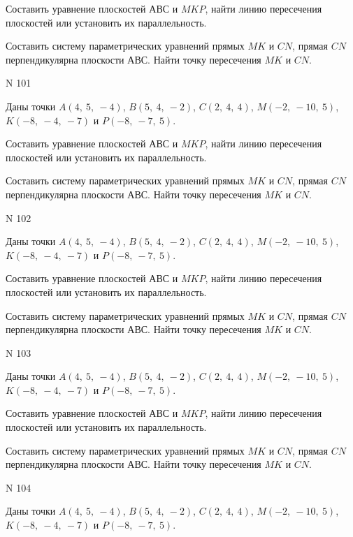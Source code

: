 \documentclass[11pt]{report}
\begin{document}
Составить уравнение плоскостей $АВС$ и $MKP$,
найти линию пересечения плоскостей или установить их параллельность.

Составить систему параметрических уравнений прямых $MK$ и $CN$,
прямая $CN$ перпендикулярна плоскости $АВС$. 
Найти точку пересечения $MK$ и $CN$.



 N 101

Даны точки $A\left( 4, \  5, \  -4\right)$, $B\left( 5, \  4, \  -2\right)$, $C\left( 2, \  4, \  4\right)$, $M\left( -2, \  -10, \  5\right)$, $K\left( -8, \  -4, \  -7\right)$ и $P\left( -8, \  -7, \  5\right)$.


Составить уравнение плоскостей $АВС$ и $MKP$,
найти линию пересечения плоскостей или установить их параллельность.

Составить систему параметрических уравнений прямых $MK$ и $CN$,
прямая $CN$ перпендикулярна плоскости $АВС$. 
Найти точку пересечения $MK$ и $CN$.



 N 102

Даны точки $A\left( 4, \  5, \  -4\right)$, $B\left( 5, \  4, \  -2\right)$, $C\left( 2, \  4, \  4\right)$, $M\left( -2, \  -10, \  5\right)$, $K\left( -8, \  -4, \  -7\right)$ и $P\left( -8, \  -7, \  5\right)$.


Составить уравнение плоскостей $АВС$ и $MKP$,
найти линию пересечения плоскостей или установить их параллельность.

Составить систему параметрических уравнений прямых $MK$ и $CN$,
прямая $CN$ перпендикулярна плоскости $АВС$. 
Найти точку пересечения $MK$ и $CN$.



 N 103

Даны точки $A\left( 4, \  5, \  -4\right)$, $B\left( 5, \  4, \  -2\right)$, $C\left( 2, \  4, \  4\right)$, $M\left( -2, \  -10, \  5\right)$, $K\left( -8, \  -4, \  -7\right)$ и $P\left( -8, \  -7, \  5\right)$.


Составить уравнение плоскостей $АВС$ и $MKP$,
найти линию пересечения плоскостей или установить их параллельность.

Составить систему параметрических уравнений прямых $MK$ и $CN$,
прямая $CN$ перпендикулярна плоскости $АВС$. 
Найти точку пересечения $MK$ и $CN$.



 N 104

Даны точки $A\left( 4, \  5, \  -4\right)$, $B\left( 5, \  4, \  -2\right)$, $C\left( 2, \  4, \  4\right)$, $M\left( -2, \  -10, \  5\right)$, $K\left( -8, \  -4, \  -7\right)$ и $P\left( -8, \  -7, \  5\right)$.
\end{document}

